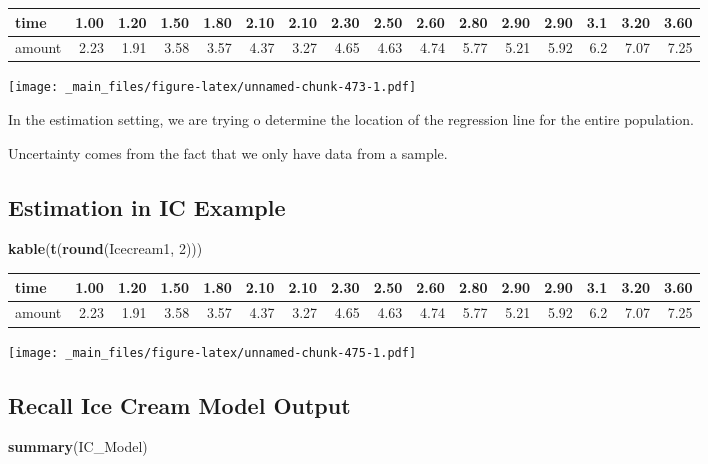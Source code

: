 \documentclass[]{book}
\newenvironment{Shaded}{\begin{snugshade}}{\end{snugshade}}
\newcommand{\KeywordTok}[1]{\textcolor[rgb]{0.13,0.29,0.53}{\textbf{#1}}}
\newcommand{\DecValTok}[1]{\textcolor[rgb]{0.00,0.00,0.81}{#1}}
\newcommand{\NormalTok}[1]{#1}
\begin{document}
\begin{tabular}{l|r|r|r|r|r|r|r|r|r|r|r|r|r|r|r}
\hline
time & 1.00 & 1.20 & 1.50 & 1.80 & 2.10 & 2.10 & 2.30 & 2.50 & 2.60 & 2.80 & 2.90 & 2.90 & 3.1 & 3.20 & 3.60\\
\hline
amount & 2.23 & 1.91 & 3.58 & 3.57 & 4.37 & 3.27 & 4.65 & 4.63 & 4.74 & 5.77 & 5.21 & 5.92 & 6.2 & 7.07 & 7.25\\
\hline
\end{tabular}

\texttt{[image: \_main\_files/figure-latex/unnamed-chunk-473-1.pdf]}

In the estimation setting, we are trying o determine the location of the
regression line for the entire population.

Uncertainty comes from the fact that we only have data from a sample.

\subsection{Estimation in IC Example}\label{estimation-in-ic-example-1}

\begin{Shaded}
\begin{Highlighting}[]
\KeywordTok{kable}\NormalTok{(}\KeywordTok{t}\NormalTok{(}\KeywordTok{round}\NormalTok{(Icecream1, }\DecValTok{2}\NormalTok{)))}
\end{Highlighting}
\end{Shaded}

\begin{tabular}{l|r|r|r|r|r|r|r|r|r|r|r|r|r|r|r}
\hline
time & 1.00 & 1.20 & 1.50 & 1.80 & 2.10 & 2.10 & 2.30 & 2.50 & 2.60 & 2.80 & 2.90 & 2.90 & 3.1 & 3.20 & 3.60\\
\hline
amount & 2.23 & 1.91 & 3.58 & 3.57 & 4.37 & 3.27 & 4.65 & 4.63 & 4.74 & 5.77 & 5.21 & 5.92 & 6.2 & 7.07 & 7.25\\
\hline
\end{tabular}

\texttt{[image: \_main\_files/figure-latex/unnamed-chunk-475-1.pdf]}

\subsection{Recall Ice Cream Model
Output}\label{recall-ice-cream-model-output}

\begin{Shaded}
\begin{Highlighting}[]
\KeywordTok{summary}\NormalTok{(IC_Model)}
\end{Highlighting}
\end{Shaded}
\end{document}
